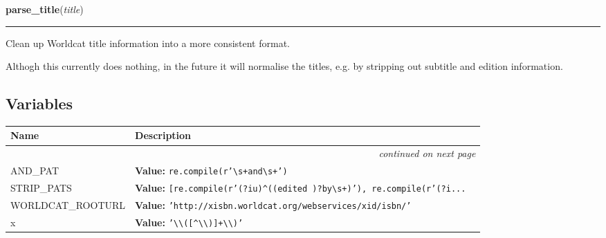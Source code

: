 \hspace{.8\funcindent}\begin{boxedminipage}{\funcwidth}

    \raggedright \textbf{parse\_title}(\textit{title})

    \vspace{-1.5ex}

    \rule{\textwidth}{0.5\fboxrule}
\setlength{\parskip}{2ex}

Clean up Worldcat title information into a more consistent format.

Althogh this currently does nothing, in the future it will normalise the
titles, e.g. by stripping out subtitle and edition information.
\setlength{\parskip}{1ex}
    \end{boxedminipage}



  \subsection{Variables}

    \vspace{-1cm}
\hspace{\varindent}\begin{longtable}{|p{\varnamewidth}|p{\vardescrwidth}|l}
\cline{1-2}
\cline{1-2} \centering \textbf{Name} & \centering \textbf{Description}& \\
\cline{1-2}
\endhead\cline{1-2}\multicolumn{3}{r}{\small\textit{continued on next page}}\\\endfoot\cline{1-2}
\endlastfoot\raggedright A\-N\-D\-\_\-P\-A\-T\- & \raggedright \textbf{Value:} 
{\tt re.compile(r'{\textbackslash}s\texttt{+}and{\textbackslash}s\texttt{+}')}&\\
\cline{1-2}
\raggedright S\-T\-R\-I\-P\-\_\-P\-A\-T\-S\- & \raggedright \textbf{Value:} 
{\tt \texttt{[}re.compile(r'\texttt{(?iu)}{\textasciicircum}\texttt{(}\texttt{(}edited \texttt{)}\texttt{?}by{\textbackslash}s\texttt{+}\texttt{)}')\texttt{, }re.compile(r'\texttt{(?i}\texttt{...}}&\\
\cline{1-2}
\raggedright W\-O\-R\-L\-D\-C\-A\-T\-\_\-R\-O\-O\-T\-U\-R\-L\- & \raggedright \textbf{Value:} 
{\tt \texttt{'}\texttt{http://xisbn.worldcat.org/webservices/xid/isbn/}\texttt{'}}&\\
\cline{1-2}
\raggedright x\- & \raggedright \textbf{Value:} 
{\tt \texttt{'}\texttt{{\textbackslash}{\textbackslash}([{\textasciicircum}{\textbackslash}{\textbackslash})]+{\textbackslash}{\textbackslash})}\texttt{'}}&\\
\cline{1-2}
\end{longtable}


